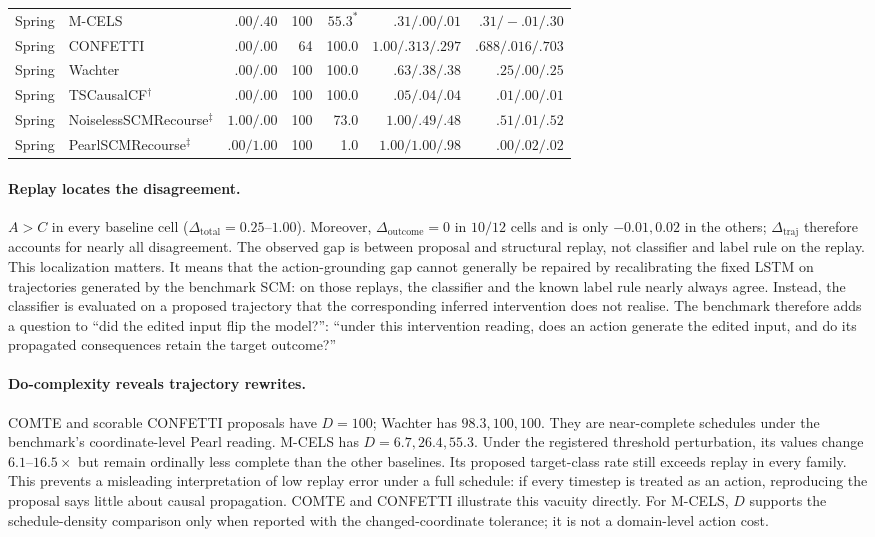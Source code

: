\documentclass{article}
\newcommand{\dototal}{\Delta_{\mathrm{total}}}
\newcommand{\dotraj}{\Delta_{\mathrm{traj}}}
\newcommand{\dooutcome}{\Delta_{\mathrm{outcome}}}
\begin{document}
\begin{table}[t]
\begin{tabular}{@{}llrrrrr@{}}
    Spring & M-CELS   & $.00/.40$ & 100 & $55.3^{*}$ & $.31/.00/.01$ & $.31/-.01/.30$ \\
    Spring & CONFETTI & $.00/.00$ &  64 & 100.0 & $1.00/.313/.297$ & $.688/.016/.703$ \\
    Spring & Wachter  & $.00/.00$ & 100 & 100.0 & $.63/.38/.38$ & $.25/.00/.25$ \\
    Spring & TSCausalCF$^{\dagger}$ & $.00/.00$ & 100 & 100.0 & $.05/.04/.04$ & $.01/.00/.01$ \\
    Spring & NoiselessSCMRecourse$^{\ddagger}$ & $1.00/.00$ & 100 & 73.0 & $1.00/.49/.48$ & $.51/.01/.52$ \\
    Spring & PearlSCMRecourse$^{\ddagger}$ & $.00/1.00$ & 100 & 1.0 & $1.00/1.00/.98$ & $.00/.02/.02$ \\
    \bottomrule
  \end{tabular}
\end{table}

\paragraph{Replay locates the disagreement.}
\label{sec:res-decomposition}

$A>C$ in every baseline cell ($\dototal=0.25$--$1.00$). Moreover, $\dooutcome=0$ in $10/12$ cells and is only $-0.01,0.02$ in the others; $\dotraj$ therefore accounts for nearly all disagreement. The observed gap is between proposal and structural replay, not classifier and label rule on the replay. This localization matters. It means that the action-grounding gap cannot generally be repaired by recalibrating the fixed LSTM on trajectories generated by the benchmark SCM: on those replays, the classifier and the known label rule nearly always agree. Instead, the classifier is evaluated on a proposed trajectory that the corresponding inferred intervention does not realise. The benchmark therefore adds a question to ``did the edited input flip the model?'': ``under this intervention reading, does an action generate the edited input, and do its propagated consequences retain the target outcome?''

\paragraph{Do-complexity reveals trajectory rewrites.}
\label{sec:res-complexity}

COMTE and scorable CONFETTI proposals have $D=100$; Wachter has $98.3,100,100$. They are near-complete schedules under the benchmark's coordinate-level Pearl reading. M-CELS has $D=6.7,26.4,55.3$. Under the registered threshold perturbation, its values change $6.1$--$16.5\times$ but remain ordinally less complete than the other baselines. Its proposed target-class rate still exceeds replay in every family. This prevents a misleading interpretation of low replay error under a full schedule: if every timestep is treated as an action, reproducing the proposal says little about causal propagation. COMTE and CONFETTI illustrate this vacuity directly. For M-CELS, $D$ supports the schedule-density comparison only when reported with the changed-coordinate tolerance; it is not a domain-level action cost.
\end{document}
